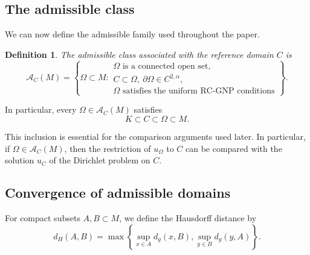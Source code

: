 \documentclass{article}
\renewcommand{\boxed}[1]{#1}
\newtheorem{definition}[theorem]{Definition}
\begin{document}
\subsection{The admissible class}
\label{subsec:admissible-class}

We can now define the admissible family used throughout the paper.

\begin{definition}\label{def:admissible-class}
The admissible class associated with the reference domain $C$ is
\[
\mathcal A_C(M)
=
\left\{
\Omega\subset M:
\begin{array}{l}
\Omega \text{ is a connected open set},\\
C\subset\Omega,\ \partial\Omega\in C^{2,\alpha},\\
\Omega \text{ satisfies the uniform RC-GNP conditions}
\end{array}
\right\}.
\]
\end{definition}
In particular, every $\Omega\in\mathcal A_C(M)$ satisfies
\begin{equation}
K\subset C\subset\Omega\subset M.
\label{eq:admissible-class}
\end{equation}

This inclusion is essential for the comparison arguments used later.
In particular, if $\Omega\in\mathcal A_C(M)$, then the restriction of
$u_\Omega$ to $C$ can be compared with the solution $u_C$ of the
Dirichlet problem on $C$.

\subsection{Convergence of admissible domains}
\label{subsec:domain-convergence}

For compact subsets $A,B\subset M$, we define the Hausdorff distance
by
\begin{equation}
d_H(A,B)
=
\max
\left\{
\sup_{x\in A}d_g(x,B),
\sup_{y\in B}d_g(y,A)
\right\}.
\label{eq:hausdorff-distance}
\end{equation}
\end{document}
